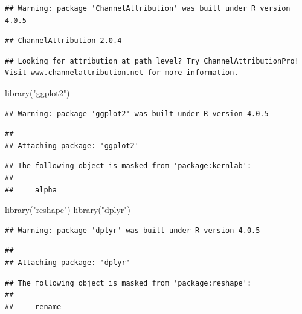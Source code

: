 \documentclass[
]{book}
\newenvironment{Shaded}{\begin{snugshade}}{\end{snugshade}}
\newcommand{\FunctionTok}[1]{\textcolor[rgb]{0.00,0.00,0.00}{#1}}
\newcommand{\NormalTok}[1]{#1}
\newcommand{\StringTok}[1]{\textcolor[rgb]{0.31,0.60,0.02}{#1}}
\begin{document}
\begin{verbatim}
## Warning: package 'ChannelAttribution' was built under R version 4.0.5
\end{verbatim}

\begin{verbatim}
## ChannelAttribution 2.0.4
\end{verbatim}

\begin{verbatim}
## Looking for attribution at path level? Try ChannelAttributionPro! Visit www.channelattribution.net for more information.
\end{verbatim}

\begin{Shaded}
\begin{Highlighting}[]
\FunctionTok{library}\NormalTok{(}\StringTok{"ggplot2"}\NormalTok{)}
\end{Highlighting}
\end{Shaded}

\begin{verbatim}
## Warning: package 'ggplot2' was built under R version 4.0.5
\end{verbatim}

\begin{verbatim}
## 
## Attaching package: 'ggplot2'
\end{verbatim}

\begin{verbatim}
## The following object is masked from 'package:kernlab':
## 
##     alpha
\end{verbatim}

\begin{Shaded}
\begin{Highlighting}[]
\FunctionTok{library}\NormalTok{(}\StringTok{"reshape"}\NormalTok{)}
\FunctionTok{library}\NormalTok{(}\StringTok{"dplyr"}\NormalTok{)}
\end{Highlighting}
\end{Shaded}

\begin{verbatim}
## Warning: package 'dplyr' was built under R version 4.0.5
\end{verbatim}

\begin{verbatim}
## 
## Attaching package: 'dplyr'
\end{verbatim}

\begin{verbatim}
## The following object is masked from 'package:reshape':
## 
##     rename
\end{verbatim}
\end{document}

